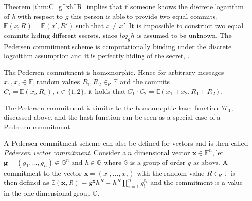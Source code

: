 Theorem \ref{thm:C=g^xh^R} implies that if someone knows the discrete logarithm of $h$ with respect to $g$ this person is able to provide two equal commits, $\mathds{E}(x,R)=\mathds{E}(x',R')$ such that $x\neq x'$. It is impossible to construct two equal commits hiding different secrets, since $log_g h$ is assumed to be unknown. The Pedersen commitment scheme is computationally binding under the discrete logarithm assumption and it is perfectly hiding of the secret, \cite{pedersen}. 

The Pedersen commitment is homomorphic. Hence for arbitrary messages $x_1,x_2\in\mathds{F}$, random values $R_1,R_2\in_R\mathds{F}$ and the commits $C_i=\mathds{E}(x_i,R_i),\:i\in\{1,2\}$, it holds that $C_1\cdot C_2 = \mathds{E}(x_1+x_2,R_1+R_2)$.

The Pedersen commitment is similar to the homomorphic hash function $\mathcal{H}_1$, discussed above, and the hash function can be seen as a  special case of a Pedersen commitment.

A Pedersen commitment scheme can also be defined for vectors and is then called \textit{Pedersen vector commitment}. Consider a $n$ dimensional vector $\mathbf{x}\in\mathds{F}^n$, let $\mathbf{g}=(g_1,...,g_n) \in\mathds{G}^n$ and $h\in\mathds{G}$ where $\mathds{G}$ is a group of order $q$ as above. A commitment to the vector  $\mathbf{x}=(x_1,...,x_n)$  with the random value $R\in_R \mathds{F}$ is then defined as $\mathds{E}(\mathbf{x},R) = \mathbf{g}^\mathbf{x}h^R = h^R\prod_{i=1}^n g_i^{x_i}$ and the commitment is a value in the one-dimensional group $\mathds{G}$. 

